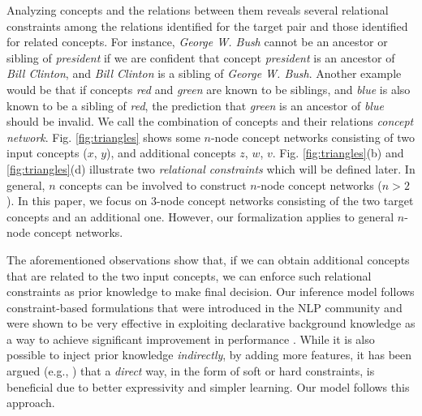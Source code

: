 
Analyzing concepts and the relations between them reveals several
relational constraints among the relations identified for the target
pair and those identified for related concepts. For instance, 
{\em George W. Bush} cannot be an ancestor or sibling of {\em
  president} if we are confident that concept {\em president} is an
ancestor of {\em Bill Clinton}, and {\em Bill Clinton} is a
sibling of {\em George W. Bush}. Another example would be that
if concepts {\em red} and {\em green} are known to be siblings, and {\em blue} is also known to be a sibling of {\em red}, the
prediction that {\em green} is an ancestor of {\em blue} should be
invalid. We call the combination of concepts and their relations {\em
  concept network}. Fig. \ref{fig:triangles} shows some $n$-node
concept networks consisting of two input concepts ($x$, $y$), and
additional concepts $z$, $w$, $v$. Fig. \ref{fig:triangles}(b) and
\ref{fig:triangles}(d) illustrate two {\em relational constraints}
which will be defined later. In general, $n$ concepts can be involved
to construct $n$-node concept networks ($n > 2$). In this paper, we
focus on $3$-node concept networks consisting of the two
target concepts and an additional one. However, our formalization
applies to general $n$-node concept networks.


The aforementioned observations show that, if we can obtain additional
concepts that are related to the two input concepts, we can enforce
such relational constraints as prior knowledge to make final
decision. Our inference model follows constraint-based formulations that
were introduced in the NLP community and were shown to be very
effective in exploiting declarative background knowledge as a way to
achieve significant improvement in performance
\cite{RothYi04,PRYZ05,CGRT09,DenisBa07,PunyakanokRoYi05}. While it is
also possible to inject prior knowledge {\em indirectly}, by adding
more features, it has been argued (e.g., \cite{RothYi05,ChangRaRo08})
that a {\em direct} way, in the form of soft or hard constraints, is
beneficial due to better expressivity and simpler learning. Our model
follows this approach.

